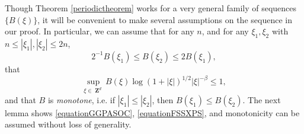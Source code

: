 \documentclass[12pt,reqno]{article}
\numberwithin{equation}{section}
\DeclareMathOperator{\ZZ}{\mathbf{Z}}
\begin{document}
Though Theorem \ref{periodictheorem} works for a very general family of sequences $\{ B(\xi) \}$, it will be convenient to make several assumptions on the sequence in our proof. In particular, we can assume that for any $n$, and for any $\xi_1,\xi_2$ with $n \leq |\xi_1|, |\xi_2| \leq 2n$,
%
\begin{equation} \label{equationGGPASOC}
    2^{-1} B(\xi_1) \leq B(\xi_2) \leq 2B(\xi_1),
\end{equation}
%
that
%
\begin{equation} \label{equationFSSXPS}
    \sup_{\xi \in \ZZ^d} B(\xi) \log(1 + |\xi|)^{1/2} |\xi|^{-\beta} \leq 1,
\end{equation}
%
and that $B$ is \emph{monotone}, i.e. if $|\xi_1| \leq |\xi_2|$, then $B(\xi_1) \leq B(\xi_2)$. The next lemma shows \eqref{equationGGPASOC}, \eqref{equationFSSXPS}, and monotonicity can be assumed without loss of generality.
\end{document}

